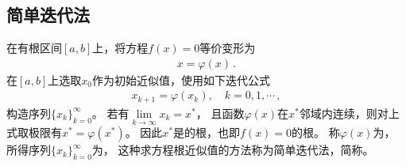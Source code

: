 \subsection{简单迭代法}\label{sub:简单迭代法}
\begin{definition}
    在有根区间$[a,b]$上，将方程$f(x)=0$等价变形为
    \begin{align}\label{eq:02ex0306}
        x=\varphi(x)\, .
    \end{align}
    在$[a,b]$上选取$x_0$作为初始近似值，使用如下迭代公式
    \begin{align}\label{eq:02ex0307}
        x_{k+1}=\varphi(x_k),\quad k=0,1,\cdots\, ,
    \end{align}
    构造序列$\{x_k\}_{k=0}^\infty$。
    若有$\displaystyle\lim\limits_{k\rightarrow\infty}{x_k}=x^*$，
    且函数$\varphi(x)$在$x^*$邻域内连续，则对上式取极限有$x^*=\varphi(x^*)$。
    因此$x^*$是的根，也即$f(x)=0$的根。
    称$\varphi(x)$为，
    所得序列$\{x_k\}_{k=0}^\infty$为，
    这种求方程根近似值的方法称为简单迭代法，简称。
\end{definition}

